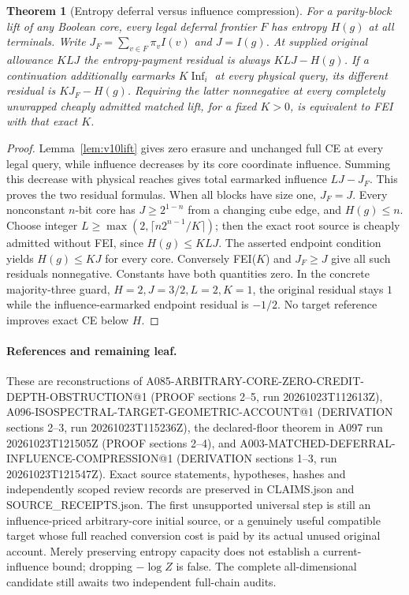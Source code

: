 \documentclass[11pt]{article}
\newtheorem{theorem}[lemma]{Theorem}
\begin{document}
\begin{theorem}[Entropy deferral versus influence compression]\label{thm:v10rate}
For a parity-block lift of any Boolean core, every legal deferral
frontier $F$ has entropy $H(g)$ at all terminals. Write
$J_F=\sum_{v\in F}\pi_vI(v)$ and $J=I(g)$. At supplied original
allowance $K L J$ the entropy-payment residual is always $K L J-H(g)$.
If a continuation additionally earmarks $K\operatorname{Inf}_i$ at
every physical query, its different residual is $KJ_F-H(g)$. Requiring
the latter nonnegative at every completely unwrapped cheaply admitted
matched lift, for a fixed $K>0$, is equivalent to FEI with that exact
$K$.
\end{theorem}
\begin{proof}
Lemma~\ref{lem:v10lift} gives zero erasure and unchanged full CE at
every legal query, while influence decreases by its core coordinate
influence. Summing this decrease with physical reaches gives total
earmarked influence $LJ-J_F$. This proves the two residual formulas.
When all blocks have size one, $J_F=J$. Every nonconstant $n$-bit core
has $J\ge2^{1-n}$ from a changing cube edge, and $H(g)\le n$.
Choose integer $L\ge\max(2,\lceil n2^{n-1}/K\rceil)$; then the exact
root source is cheaply admitted without FEI, since $H(g)\le KLJ$.
The asserted endpoint condition yields $H(g)\le KJ$ for every core.
Conversely FEI($K$) and $J_F\ge J$ give all such residuals
nonnegative. Constants have both quantities zero. In the concrete
majority-three guard, $H=2,J=3/2,L=2,K=1$, the original residual
stays $1$ while the influence-earmarked endpoint residual is $-1/2$.
No target reference improves exact CE below $H$.
\end{proof}

\paragraph{References and remaining leaf.}
These are reconstructions of A085-ARBITRARY-CORE-ZERO-CREDIT-DEPTH-OBSTRUCTION@1
(PROOF sections 2--5, run 20261023T112613Z),
A096-ISOSPECTRAL-TARGET-GEOMETRIC-ACCOUNT@1
(DERIVATION sections 2--3, run 20261023T115236Z),
the declared-floor theorem in A097 run 20261023T121505Z (PROOF sections 2--4),
and A003-MATCHED-DEFERRAL-INFLUENCE-COMPRESSION@1
(DERIVATION sections 1--3, run 20261023T121547Z).
Exact source statements, hypotheses, hashes and independently scoped
review records are preserved in CLAIMS.json and SOURCE_RECEIPTS.json.
The first unsupported universal step is still an influence-priced
arbitrary-core initial source, or a genuinely useful compatible target
whose full reached conversion cost is paid by its actual unused original
account. Merely preserving entropy capacity does not establish a
current-influence bound; dropping $-\log Z$ is false. The complete
all-dimensional candidate still awaits two independent full-chain audits.
\end{document}
